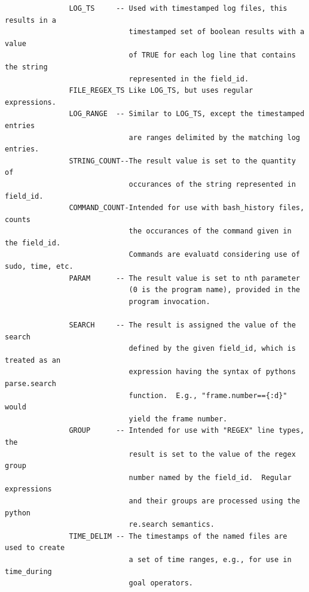 \documentclass[12pt]{article}
\begin{document}
\begin{verbatim}
               LOG_TS     -- Used with timestamped log files, this results in a 
                             timestamped set of boolean results with a value
                             of TRUE for each log line that contains the string 
                             represented in the field_id.
               FILE_REGEX_TS Like LOG_TS, but uses regular expressions.
               LOG_RANGE  -- Similar to LOG_TS, except the timestamped entries
                             are ranges delimited by the matching log entries.
               STRING_COUNT--The result value is set to the quantity of
                             occurances of the string represented in field_id.
               COMMAND_COUNT-Intended for use with bash_history files, counts
                             the occurances of the command given in the field_id.
                             Commands are evaluatd considering use of sudo, time, etc.
               PARAM      -- The result value is set to nth parameter
                             (0 is the program name), provided in the 
                             program invocation.  
                             
               SEARCH     -- The result is assigned the value of the search 
                             defined by the given field_id, which is treated as an
                             expression having the syntax of pythons parse.search 
                             function.  E.g., "frame.number=={:d}" would 
                             yield the frame number.
               GROUP      -- Intended for use with "REGEX" line types, the 
                             result is set to the value of the regex group 
                             number named by the field_id.  Regular expressions
                             and their groups are processed using the python
                             re.search semantics.
               TIME_DELIM -- The timestamps of the named files are used to create 
                             a set of time ranges, e.g., for use in time_during 
                             goal operators.
                             

\end{verbatim}
\end{document}
